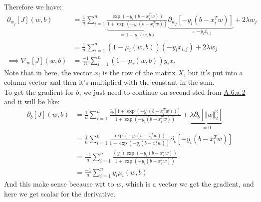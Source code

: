 \documentclass[]{article}
\begin{document}
        Therefore we have: 
        \begin{align*}\tag{A.6.a.4}\label{eqn:A.6.a.4}
            \partial_{w_j}[J](w, b)
            &= 
            \frac{1}{n}\sum_{i  = 1}^{n}
                \underbrace{\frac{
                    \exp(-y_i(b - x_i^T w))
                }
                {
                    1 + \exp(-y_i(b - x_i^T w))
                }}_{= 1- \mu_i(w, b)}\underbrace{\partial_{w_j}[-y_i(b - x_i^Tw)]}_{= -y_ix_{i,j}}
                + 2\lambda w_j
            \\
            &= 
            \frac{1}{n}\sum_{i  = 1}^{n}
                (1- \mu_i(w, b))(-y_i x_{i, j})
                + 2\lambda w_j
            \\
            \implies \nabla_w[J](w, b) &= \frac{-1}{n}\sum_{i = 1}^{n}
                (1 - \mu_i(w, b))y_ix_i
        \end{align*}
        Note that in here, the vector $x_i$ is the row of the matrix $X$, but it's put into a column vector and then it's multiplied with the constant in the sum. 
        \\
        To get the gradient for $b$, we just need to continue on second sted from \hyperref[eqn:A.6.a.2]{A.6.a.2} and it will be like: 
        \begin{align*}\tag{A.6.a.5}\label{eqn:A.6.a.5}
            \partial_{b}[J](w, b)
            &= 
            \frac{1}{n}\sum_{i  = 1}^{n}
                \frac{
                    \partial_{b}[1 + \exp(-y_i(b - x_i^T w))]
                }
                {
                    1 + \exp(-y_i(b - x_i^T w))
                }
                +
                \underbrace{\lambda\partial_{b}[\Vert w\Vert_2^2]}_{ = 0}
            \\
            &= 
            \frac{1}{n}\sum_{i  = 1}^{n}
                \frac{
                    \exp(-y_i(b - x_i^T w))
                }
                {
                    1 + \exp(-y_i(b - x_i^T w))
                }
                \partial_{b}[-y_i(b - x_i^Tw)]
            \\
            &=
            \frac{-1}{n}\sum_{i  = 1}^{n}
                \frac{
                    (y_i)\exp(-y_i(b - x_i^T w))
                }
                {
                    1 + \exp(-y_i(b - x_i^T w))
                }
            \\
            &=
            \frac{-1}{n}\sum_{i  = 1}^{n}
                y_i\mu_i(w, b)
        \end{align*}
        And this make sense because wrt to $w$, which is a vector we get the gradient, and here we get scalar for the derivative. 
\end{document}

